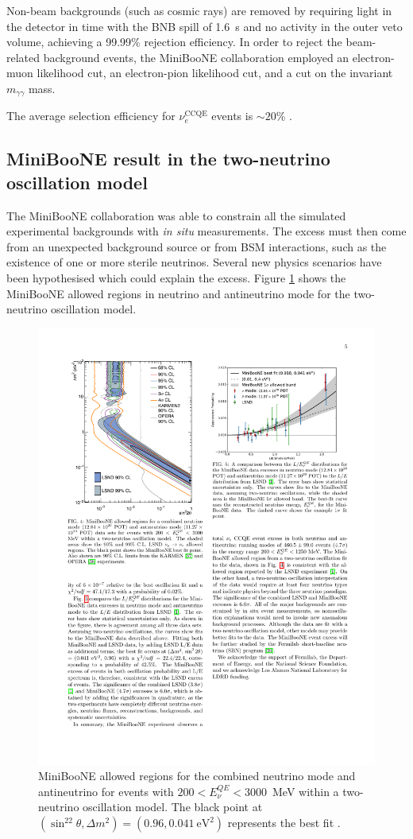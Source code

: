 Non-beam backgrounds (such as cosmic rays) are removed by requiring light in the detector in time with the BNB spill of 1.6~\si{\micro}s and no activity in the outer veto volume, achieving a 99.99\% rejection efficiency. 
In order to reject the beam-related background events, the MiniBooNE collaboration employed an electron-muon likelihood cut, an electron-pion likelihood cut, and a cut on the invariant $m_{\gamma\gamma}$ mass.

The average selection efficiency for $\nu_e^{\mathrm{CCQE}}$ events is $\sim20$\% \cite{Aguilar-Arevalo:2018gpe}.

\subsection*{MiniBooNE result in the two-neutrino oscillation model}
The MiniBooNE collaboration was able to constrain all the simulated experimental backgrounds with \emph{in situ} measurements. The excess must then come from an unexpected background source or from BSM interactions, such as the existence of one or more sterile neutrinos.
Several new physics scenarios have been hypothesised which could explain the excess. Figure \ref{fig:miniboone_bestfit} shows the MiniBooNE allowed regions in neutrino and antineutrino mode for the two-neutrino oscillation model. 

\begin{figure}[htbp]
    \centering
    \includegraphics[width=0.7\linewidth]{figures/miniboone_bestfit.pdf}
    \caption{MiniBooNE allowed regions for the combined neutrino mode and antineutrino for events with $200<E_{\nu}^{QE}<3000$~MeV within a two-neutrino oscillation model. The black point at $( \sin^22\theta, \Delta m^2)=(0.96, 0.041~\mathrm{eV^2})$ represents the best fit \cite{Aguilar-Arevalo:2018gpe}.}
    \label{fig:miniboone_bestfit}
\end{figure}

